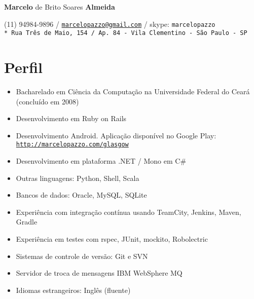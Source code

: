 \documentclass[11pt]{article}
\def\name{\textbf{Marcelo} de Brito Soares \textbf{Almeida}}
\begin{document}
\begin{flushright}

{\huge \name}

\vspace{0.05in}
(11) 94984-9896 / \href{mailto:marcelopazzo@gmail.com}{\tt marcelopazzo@gmail.com} / skype: \tt marcelopazzo
\vspace{0.01in} \\* 
Rua Três de Maio, 154 / Ap. 84 - Vila Clementino - São Paulo - SP

\end{flushright}

\section*{Perfil}
\begin{itemize}
  \item Bacharelado em Ciência da Computação na Universidade Federal do Ceará (concluído em 2008)
  \item Desenvolvimento em Ruby on Rails
  \item Desenvolvimento Android. Aplicação disponível no Google Play:
            \href{http://marcelopazzo.com/glasgow}{\tt http://marcelopazzo.com/glasgow}
  \item Desenvolvimento em plataforma .NET / Mono em C\#
  \item Outras linguagens: Python, Shell, Scala
  \item Bancos de dados: Oracle, MySQL, SQLite
  \item Experiência com integração contínua usando TeamCity, Jenkins, Maven, Gradle
  \item Experiência em testes com rspec, JUnit, mockito, Robolectric
  \item Sistemas de controle de versão: Git e SVN
  \item Servidor de troca de mensagens IBM WebSphere MQ
  \item Idiomas estrangeiros: Inglês (fluente)
\end{itemize}
\end{document}

